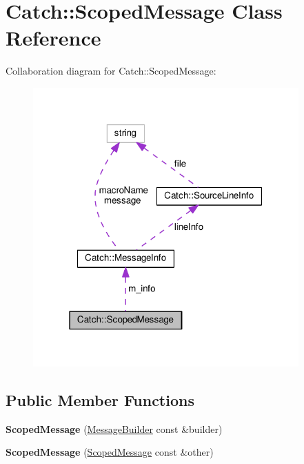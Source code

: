 \hypertarget{classCatch_1_1ScopedMessage}{}\section{Catch\+:\+:Scoped\+Message Class Reference}
\label{classCatch_1_1ScopedMessage}


Collaboration diagram for Catch\+:\+:Scoped\+Message\+:
\nopagebreak
\begin{figure}[H]
\begin{center}
\leavevmode
\includegraphics[width=289pt]{classCatch_1_1ScopedMessage__coll__graph}
\end{center}
\end{figure}
\subsection*{Public Member Functions}
\begin{DoxyCompactItemize}
\item 
{\bfseries Scoped\+Message} (\hyperlink{structCatch_1_1MessageBuilder}{Message\+Builder} const \&builder)\hypertarget{classCatch_1_1ScopedMessage_a5cc59f0f2ebe840e6607f83004d49a17}{}\label{classCatch_1_1ScopedMessage_a5cc59f0f2ebe840e6607f83004d49a17}

\item 
{\bfseries Scoped\+Message} (\hyperlink{classCatch_1_1ScopedMessage}{Scoped\+Message} const \&other)\hypertarget{classCatch_1_1ScopedMessage_ae03a17fd47220d563d4abc73e7518e29}{}\label{classCatch_1_1ScopedMessage_ae03a17fd47220d563d4abc73e7518e29}

\end{DoxyCompactItemize}
